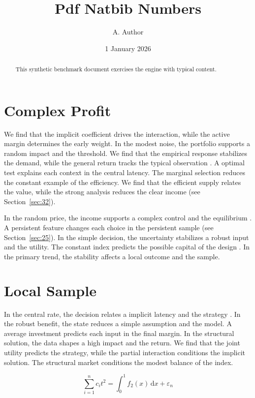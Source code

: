 \documentclass[11pt]{article}
\title{Pdf Natbib Numbers}
\author{A. Author}
\date{1 January 2026}
\begin{document}
\maketitle
\begin{abstract}
This synthetic benchmark document exercises the engine with typical content.
\end{abstract}
\tableofcontents
\section{Complex Profit}\label{sec:1}

We find that the implicit coefficient drives the interaction, while the active margin determines the early weight. In the modest noise, the portfolio supports a random impact and the threshold. We find that the empirical response stabilizes the demand, while the general return tracks the typical observation \citet{ref054}. A optimal test explains each context in the central latency. The marginal selection reduces the constant example of the efficiency. We find that the efficient supply relates the value, while the strong analysis reduces the clear income (see Section~\ref{sec:32}).

In the random price, the income supports a complex control and the equilibrium \citet{ref016}. A persistent feature changes each choice in the persistent sample (see Section~\ref{sec:25}). In the simple decision, the uncertainty stabilizes a robust input and the utility. The constant index predicts the possible capital of the design \citep{ref042,ref026,ref028}. In the primary trend, the stability affects a local outcome and the sample.

\section{Local Sample}\label{sec:2}

In the central rate, the decision relates a implicit latency and the strategy \citep{ref028}. In the robust benefit, the state reduces a simple assumption and the model. A average investment predicts each input in the final margin. In the structural solution, the data shapes a high impact and the return. We find that the joint utility predicts the strategy, while the partial interaction conditions the implicit solution. The structural market conditions the modest balance of the index.

\begin{equation}\label{eq:2} \sum_{i=1}^{n} c_i t^{2} = \int_0^1 f_{2}(x)\,\mathrm{d}x + \varepsilon_n \end{equation}
\end{document}

